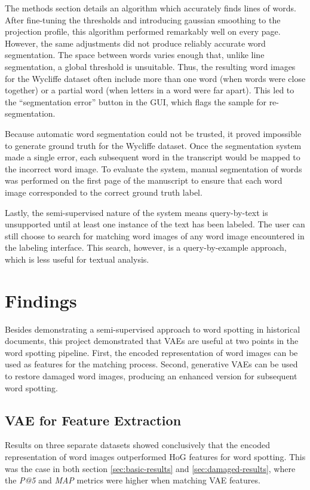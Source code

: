 \documentclass[final]{ukthesis}
\begin{document}
The methods section details an algorithm which accurately finds lines of words. After fine-tuning the thresholds and introducing gaussian smoothing to the projection profile, this algorithm performed remarkably well on every page. However, the same adjustments did not produce reliably accurate word segmentation. The space between words varies enough that, unlike line segmentation, a global threshold is unsuitable. Thus, the resulting word images for the Wycliffe dataset often include more than one word (when words were close together) or a partial word (when letters in a word were far apart). This led to the ``segmentation error'' button in the GUI, which flags the sample for re-segmentation.

Because automatic word segmentation could not be trusted, it proved impossible to generate ground truth for the Wycliffe dataset. Once the segmentation system made a single error, each subsequent word in the transcript would be mapped to the incorrect word image. To evaluate the system, manual segmentation of words was performed on the first page of the manuscript to ensure that each word image corresponded to the correct ground truth label.

Lastly, the semi-supervised nature of the system means query-by-text is unsupported until at least one instance of the text has been labeled. The user can still choose to search for matching word images of any word image encountered in the labeling interface. This search, however, is a query-by-example approach, which is less useful for textual analysis.


\section{Findings}
\label{sec:findings}
Besides demonstrating a semi-supervised approach to word spotting in historical documents, this project demonstrated that VAEs are useful at two points in the word spotting pipeline. First, the encoded representation of word images can be used as features for the matching process. Second, generative VAEs can be used to restore damaged word images, producing an enhanced version for subsequent word spotting.

\subsection{VAE for Feature Extraction}
Results on three separate datasets showed conclusively that the encoded representation of word images outperformed HoG features for word spotting. This was the case in both section \ref{sec:basic-results} and \ref{sec:damaged-results}, where the {\em P@5} and {\em MAP} metrics were higher when matching VAE features.
\end{document}
